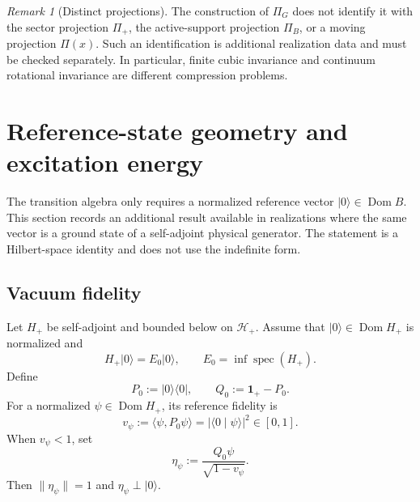 \documentclass[11pt,reqno]{scrartcl}
\newcommand{\scrHp}{\mathscr H_{+}}
\newcommand{\Pp}{\Pi_{+}}
\newcommand{\idop}{\mathbf 1}
\newcommand{\ket}[1]{\lvert #1\rangle}
\newcommand{\bra}[1]{\langle #1\rvert}
\newcommand{\braket}[2]{\langle #1\mid #2\rangle}
\newcommand{\inner}[2]{\langle #1,#2\rangle}
\DeclareMathOperator{\Dom}{Dom}
\DeclareMathOperator{\spec}{spec}
\newcommand{\SuppB}{\Pi_B}
\theoremstyle{plain}
\theoremstyle{definition}
\theoremstyle{remark}
\newtheorem{remark}[remark]{Remark}
\begin{document}
\begin{remark}[Distinct projections]
The construction of \(\Pi_G\) does not identify it with the sector projection
\(\Pp\), the active-support projection \(\SuppB\), or a moving projection
\(\Pi(x)\).  Such an identification is additional realization data and must
be checked separately.  In particular, finite cubic invariance and continuum
rotational invariance are different compression problems.
\end{remark}


\section{Reference-state geometry and excitation energy}
\label{sec:reference-state}

The transition algebra only requires a normalized reference vector
\(\ket0\in\Dom B\).  This section records an additional result available in
realizations where the same vector is a ground state of a self-adjoint
physical generator.  The statement is a Hilbert-space identity and does not
use the indefinite form.

\subsection{Vacuum fidelity}

Let \(H_+\) be self-adjoint and bounded below on \(\scrHp\).  Assume that
\(\ket0\in\Dom H_+\) is normalized and
\begin{equation}
  H_+\ket0=E_0\ket0,
  \qquad
  E_0=\inf\spec(H_+).
  \label{eq:ground-reference}
\end{equation}
Define
\begin{equation}
  P_0:=\ket0\bra0,
  \qquad
  Q_0:=\idop_+-P_0.
  \label{eq:P0Q0}
\end{equation}
For a normalized \(\psi\in\Dom H_+\), its reference fidelity is
\begin{equation}
  v_\psi:=\inner{\psi}{P_0\psi}
  =|\braket{0}{\psi}|^2\in[0,1].
  \label{eq:reference-fidelity}
\end{equation}
When \(v_\psi<1\), set
\begin{equation}
  \eta_\psi:=\frac{Q_0\psi}{\sqrt{1-v_\psi}}.
  \label{eq:conditional-excitation-vector}
\end{equation}
Then \(\|\eta_\psi\|=1\) and \(\eta_\psi\perp\ket0\).
\end{document}
